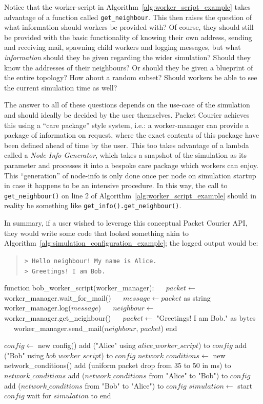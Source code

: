 Notice that the worker-script in Algorithm~\ref{alg:worker_script_example} takes advantage of a function called
\texttt{get\_neighbour}. This then raises the question of what information should workers be provided with? Of course,
they should still be provided with the basic functionality of knowing their own address, sending and receiving mail,
spawning child workers and logging messages, but what \emph{information} should they be given regarding the wider
simulation? Should they know the addresses of their neighbours? Or should they be given a blueprint of the entire
topology? How about a random subset? Should workers be able to see the current simulation time as well?

The answer to all of these questions depends on the use-case of the simulation and should ideally be decided by the
user themselves. Packet Courier achieves this using a ``care package'' style system, i.e.: a worker-manager can
provide a package of information on request, where the exact contents of this package have been defined ahead of
time by the user. This too takes advantage of a lambda called a \emph{Node-Info Generator}, which takes a snapshot of
the simulation as its parameter and processes it into a bespoke care package which workers can enjoy. This
``generation'' of node-info is only done once per node on simulation startup in case it happens to be an
intensive procedure. In this way, the call to \texttt{get\_neighbour()} on line 2 of
Algorithm~\ref{alg:worker_script_example} should in reality be something like \texttt{get\_info().get\_neighbour()}.

In summary, if a user wished to leverage this conceptual Packet Courier API, they would write some code that looked
something akin to Algorithm~\ref{alg:simulation_configuration_example}; the logged output would be:
\begin{quote}
    \texttt{> Hello neighbour! My name is Alice.} \\
    \texttt{> Greetings! I am Bob.}
\end{quote}

\newpage

\begin{algorithm}[caption={An example of what configuring a simulation might look like.},
    label={alg:simulation_configuration_example},
    captionpos=b]
    function bob_worker_script(worker_manager):
    $\quad$ $packet \gets$ worker_manager.wait_for_mail()
    $\quad$ $message \gets packet$ as string
    $\quad$ worker_manager.log($message$)
    $\quad$ $neighbour \gets$ worker_manager.get_neighbour()
    $\quad$ $packet \gets$ "Greetings! I am Bob." as bytes
    $\quad$ worker_manager.send_mail($neighbour$, $packet$)
    end

    $config \gets$ new config()
    add ("Alice" using $alice\_worker\_script$) to $config$
    add ("Bob" using $bob\_worker\_script$) to $config$
    $network\_conditions \gets$ new network_conditions()
    add (uniform packet drop from 35 to 50 in ms) to $network\_conditions$
    add ($network\_conditions$ from "Alice" to "Bob") to $config$
    add ($network\_conditions$ from "Bob" to "Alice") to $config$
    $simulation \gets$ start $config$
    wait for $simulation$ to end
\end{algorithm}

